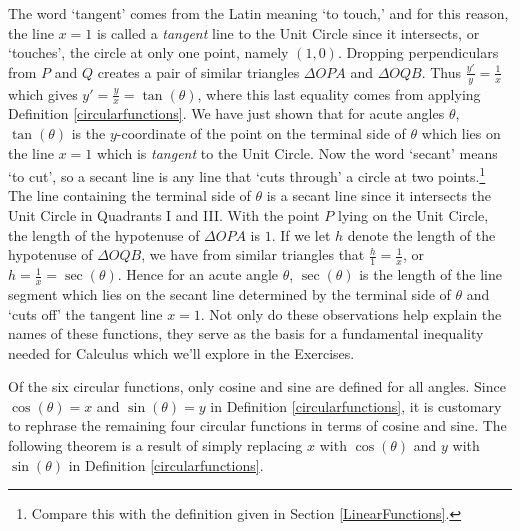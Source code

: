 The word `tangent' comes from the Latin meaning `to touch,' and for this reason, the line $x=1$ is called a \textit{tangent} line to the Unit Circle since it intersects, or `touches', the circle at only one point, namely $(1,0)$.  Dropping perpendiculars from $P$ and $Q$ creates a pair of similar triangles $\Delta OPA$ and $\Delta OQB$.  Thus $\frac{y'}{y} = \frac{1}{x}$ which gives  $y' = \frac{y}{x} = \tan(\theta)$, where this last equality comes from applying Definition  \ref{circularfunctions}. We have just shown that for acute angles $\theta$, $\tan(\theta)$ is the $y$-coordinate of the point on the terminal side of $\theta$ which lies on the line $x = 1$ which is \textit{tangent} to the Unit Circle. Now the word `secant' means `to cut', so a secant line is any line that `cuts through' a circle at two points.\footnote{Compare this with the definition given in Section \ref{LinearFunctions}.}  The line containing the terminal side of $\theta$ is a secant line since it intersects the Unit Circle in Quadrants I and III.   With the point $P$ lying on the Unit Circle, the length of the hypotenuse of $\Delta OPA$ is $1$. If we let $h$ denote the length of the hypotenuse of $\Delta OQB$, we have from similar triangles that $\frac{h}{1} = \frac{1}{x}$, or $h = \frac{1}{x} = \sec(\theta)$.  Hence for an acute angle $\theta$, $\sec(\theta)$ is the length of the line segment which lies on the secant line determined by the terminal side of $\theta$ and `cuts off' the tangent line $x=1$.  Not only do these observations help explain the names of these functions, they serve as the basis for a fundamental inequality needed for Calculus which we'll explore in the Exercises.

\smallskip 

Of the six circular functions, only cosine and sine are defined for all angles.  Since $\cos(\theta) = x$ and $\sin(\theta) = y$ in Definition \ref{circularfunctions}, it is customary to rephrase the remaining four circular functions in terms of cosine and sine.  The following theorem is a result of simply replacing $x$ with $\cos(\theta)$ and $y$ with $\sin(\theta)$ in Definition \ref{circularfunctions}.

\smallskip

